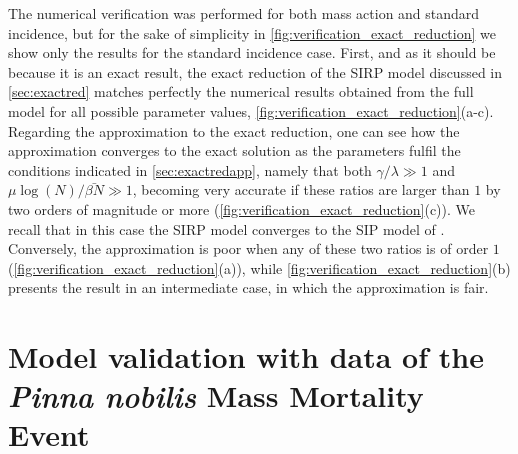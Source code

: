 The numerical verification was performed for both mass action and standard
incidence, but for the sake of simplicity in
\cref{fig:verification_exact_reduction} we show only the results for the
standard incidence case. First, and as it should be because it is an exact
result, the exact reduction of the SIRP model discussed in \cref{sec:exactred}
matches perfectly the numerical results obtained from the full model for all
possible parameter values,
\cref{fig:verification_exact_reduction}(a-c).
Regarding the approximation to the exact reduction, one can see
how the approximation converges to the exact solution as the parameters
fulfil the conditions indicated in \cref{sec:exactredapp}, namely that both
$\gamma/\lambda\gg 1$ and $\mu\log(N)/\bar{\beta N}\gg 1$, becoming very
accurate if these ratios are larger than $1$ by two orders of magnitude or more
(\cref{fig:verification_exact_reduction}(c)). We recall that in this case
the SIRP model converges to the SIP model of \cite{article_SIP}. Conversely,
the approximation is poor when any of these two ratios is of order $1$
(\cref{fig:verification_exact_reduction}(a)), while
\cref{fig:verification_exact_reduction}(b) presents the result in an
intermediate case, in which the approximation is fair.

\section{Model validation with data of the \textit{Pinna nobilis} Mass
  Mortality Event}
\label{sec:validation}


